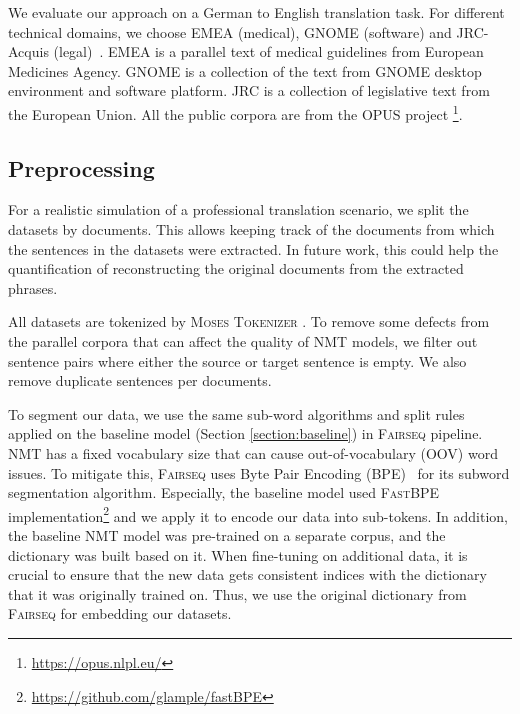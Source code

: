 We evaluate our approach on a German to English translation task. For different technical domains, we choose EMEA (medical), GNOME (software) and JRC-Acquis (legal)~\parencite{steinberger2006jrc}. EMEA is a parallel text of medical guidelines from European Medicines Agency. GNOME is a collection of the text from GNOME desktop environment and software platform. JRC is a collection of legislative text from the European Union. All the public corpora are from the OPUS project \parencite[]{tiedemann-2012-parallel}\footnote{\url{https://opus.nlpl.eu/}}.%

\subsection{Preprocessing}

For a realistic simulation of a professional translation scenario, we split the datasets by documents. This allows keeping track of the documents from which the sentences in the datasets were extracted. In future work, this could help the quantification of reconstructing the original documents from the extracted phrases.

All datasets are tokenized by \textsc{Moses Tokenizer} \parencite{koehn-etal-2007-moses}. To remove some defects from the parallel corpora that can affect the quality of NMT models, we filter out sentence pairs where either the source or target sentence is empty. We also remove duplicate sentences per documents. 

To segment our data, we use the same sub-word algorithms and split rules applied on the baseline model (Section \ref{section:baseline}) in \textsc{Fairseq} pipeline.
NMT has a fixed vocabulary size that can cause out-of-vocabulary (OOV) word issues. To mitigate this, \textsc{Fairseq} uses Byte Pair Encoding (BPE)~\parencite{sennrich-etal-2016-neural} for its subword segmentation algorithm. %
Especially, the baseline model used \textsc{FastBPE} implementation\footnote{\url{https://github.com/glample/fastBPE}} and we apply it to encode our data into sub-tokens.  
In addition, the baseline NMT model was pre-trained on a separate corpus, and the dictionary was built based on it. When fine-tuning on additional data, it is crucial to ensure that the new data gets consistent indices with the dictionary that it was originally trained on. Thus, we use the original dictionary from \textsc{Fairseq} for embedding our datasets. 

